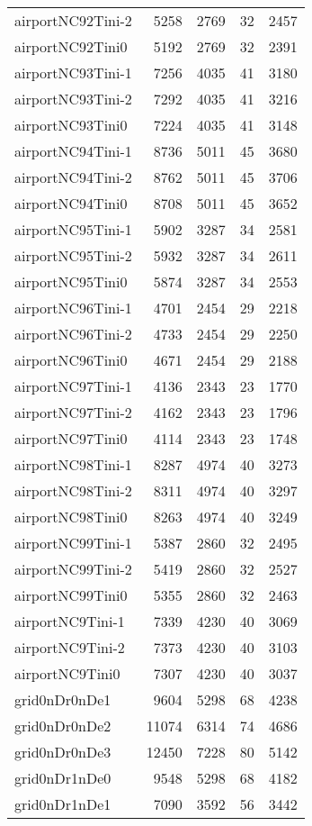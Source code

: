 \begin{longtable}{lrrrr}
airportNC92Tini-2 & 5258 & 2769 & 32 & 2457 \\
airportNC92Tini0 & 5192 & 2769 & 32 & 2391 \\
airportNC93Tini-1 & 7256 & 4035 & 41 & 3180 \\
airportNC93Tini-2 & 7292 & 4035 & 41 & 3216 \\
airportNC93Tini0 & 7224 & 4035 & 41 & 3148 \\
airportNC94Tini-1 & 8736 & 5011 & 45 & 3680 \\
airportNC94Tini-2 & 8762 & 5011 & 45 & 3706 \\
airportNC94Tini0 & 8708 & 5011 & 45 & 3652 \\
airportNC95Tini-1 & 5902 & 3287 & 34 & 2581 \\
airportNC95Tini-2 & 5932 & 3287 & 34 & 2611 \\
airportNC95Tini0 & 5874 & 3287 & 34 & 2553 \\
airportNC96Tini-1 & 4701 & 2454 & 29 & 2218 \\
airportNC96Tini-2 & 4733 & 2454 & 29 & 2250 \\
airportNC96Tini0 & 4671 & 2454 & 29 & 2188 \\
airportNC97Tini-1 & 4136 & 2343 & 23 & 1770 \\
airportNC97Tini-2 & 4162 & 2343 & 23 & 1796 \\
airportNC97Tini0 & 4114 & 2343 & 23 & 1748 \\
airportNC98Tini-1 & 8287 & 4974 & 40 & 3273 \\
airportNC98Tini-2 & 8311 & 4974 & 40 & 3297 \\
airportNC98Tini0 & 8263 & 4974 & 40 & 3249 \\
airportNC99Tini-1 & 5387 & 2860 & 32 & 2495 \\
airportNC99Tini-2 & 5419 & 2860 & 32 & 2527 \\
airportNC99Tini0 & 5355 & 2860 & 32 & 2463 \\
airportNC9Tini-1 & 7339 & 4230 & 40 & 3069 \\
airportNC9Tini-2 & 7373 & 4230 & 40 & 3103 \\
airportNC9Tini0 & 7307 & 4230 & 40 & 3037 \\
grid0nDr0nDe1 & 9604 & 5298 & 68 & 4238 \\
grid0nDr0nDe2 & 11074 & 6314 & 74 & 4686 \\
grid0nDr0nDe3 & 12450 & 7228 & 80 & 5142 \\
grid0nDr1nDe0 & 9548 & 5298 & 68 & 4182 \\
grid0nDr1nDe1 & 7090 & 3592 & 56 & 3442 \\

\end{longtable}
